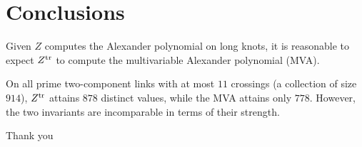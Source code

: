 \documentclass{beamer}
\theoremstyle{theorem}
\begin{document}
\section{Conclusions}

\begin{frame}
        Given $Z$ computes the Alexander polynomial on long knots, it is
        reasonable to expect $Z^{\operatorname{tr}}$ to compute the multivariable Alexander
        polynomial (MVA).

        \pause
        On all prime two-component links with at most $11$ crossings (a
        collection of size $914$), $Z^{\operatorname{tr}}$ attains $878$ distinct values,
        while the MVA attains only $778$. However, the two invariants are
        incomparable in terms of their strength.
\end{frame}

\begin{frame}
        \centering
        \Huge Thank you
\end{frame}
\end{document}
